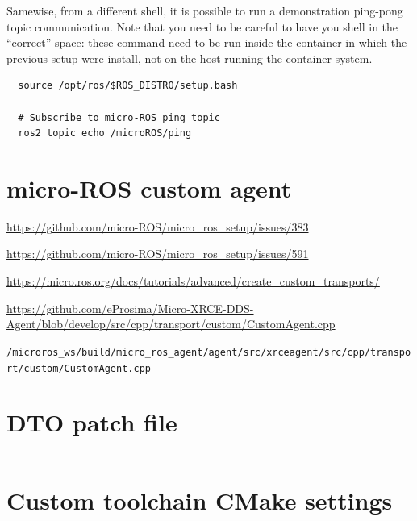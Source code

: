 \documentclass[10pt]{article}
\begin{document}
Samewise, from a different shell, it is possible to run a demonstration ping-pong topic communication.
Note that you need to be careful to have you shell in the ``correct'' space: these command need to be run inside
the container in which the previous setup were install, not on the host running the container system.
\begin{tcolorbox}
\begin{verbatim}
  source /opt/ros/$ROS_DISTRO/setup.bash
  
  # Subscribe to micro-ROS ping topic
  ros2 topic echo /microROS/ping
\end{verbatim}
\end{tcolorbox}

\section{micro-ROS custom agent}

\url{https://github.com/micro-ROS/micro_ros_setup/issues/383}

\url{https://github.com/micro-ROS/micro_ros_setup/issues/591}

\url{https://micro.ros.org/docs/tutorials/advanced/create_custom_transports/}

\url{https://github.com/eProsima/Micro-XRCE-DDS-Agent/blob/develop/src/cpp/transport/custom/CustomAgent.cpp}

\verb|/microros_ws/build/micro_ros_agent/agent/src/xrceagent/src/cpp/transport/custom/CustomAgent.cpp|

\pagebreak
\appendix
\section{DTO patch file}
\label{sec:DTO patch file}
\inputminted[linenos]{diff}{./src/system.patch}

\pagebreak
\section{Custom toolchain CMake settings}
\label{sec:toolchainsettings}
\inputminted[linenos]{cmake}{./src/custom_r5f_toolchain.cmake}
\end{document}
